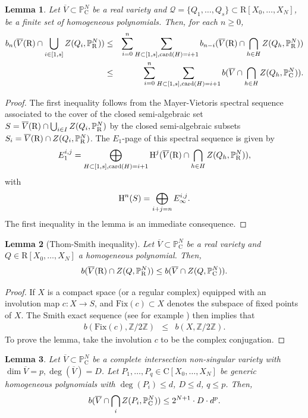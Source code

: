 \documentclass[10pt]{amsart}
\newtheorem{lemma}{Lemma}[section]
\theoremstyle{definition}
\theoremstyle{remark}
\numberwithin{equation}{section}
\newcommand {\R} {\mathrm{R}}
\newcommand {\C}     {\mathrm{C}}
\newcommand {\Z}  {\mathbb{Z}}
\newcommand {\ZZ} {{\rm Z}}
\newcommand {\PP}     {\mathbb{P}} %
\newcommand{\card}{\mathrm{card}}
\newcommand{\HH}  {\mbox{\rm H}}
\begin{document}
\begin{lemma}
    \label{lem:main:ordered:c:4}
    Let $\overline{V} \subset \PP^N_\C$ be a real variety and 
    $\mathcal{Q} = \{Q_1,\ldots,Q_s\} \subset \R[X_0,\ldots,X_N]$, be a finite set of  homogeneous polynomials. Then, for each $n \geq 0$,
    \begin{eqnarray*}
    b_n(\overline{V}(\R) \cap \bigcup_{i \in [1,s]} \ZZ(Q_i,\PP^N_\R)) &\leq& 
    \sum_{i=0}^{n} \sum_{H \subset [1,s], \card(H) = i+1} b_{n-i}(\overline{V}(\R) \cap \bigcap_{h \in H} \ZZ(Q_{h},\PP^N_\R)) \\
    &\leq&
    \sum_{i=0}^{n} \sum_{H \subset [1,s], \card(H) = i+1} b(\overline{V} \cap \bigcap_{h \in H} \ZZ(Q_{h},\PP^N_\C)).
    \end{eqnarray*}
\end{lemma}
\begin{proof}
    The first inequality follows from the Mayer-Vietoris spectral sequence associated to the cover of the closed semi-algebraic set 
    $S = \overline{V}(\R) \cap \bigcup_{i \in I} \ZZ(Q_i,\PP^N_\R)$ by the closed semi-algebraic  subsets $S_i = \overline{V}(\R) \cap \ZZ(Q_i,\PP^N_\R)$. The $E_1$-page of this spectral sequence is given by
    \[
    E_1^{i,j} = \bigoplus_{H \subset [1,s], \card(H) = i+1} \HH^{j}(\overline{V}(\R) \cap \bigcap_{h \in H} \ZZ(Q_{h},\PP^N_\R)),
    \]
    with
    \[
    \HH^n(S) = \bigoplus_{i+j=n} E_\infty^{i,j}.
    \]
    The first inequality in the lemma is an immediate consequence.
\end{proof}


\begin{lemma}[Thom-Smith inequality]
\label{lem:main:ordered:c:5}
    Let $\overline{V} \subset \PP^N_\C$ be a real variety and $Q \in \R[X_0,\ldots,X_N]$ a homogeneous polynomial. Then,
    \[
    b(\overline{V}(\R) \cap \ZZ(Q,\PP^N_\R)) \leq b(\overline{V} \cap \ZZ(Q,\PP^N_\C)).
    \]
\end{lemma}

\begin{proof}
    If $X$ is a compact space  (or a regular complex)  equipped with an involution map $c:X \rightarrow S$, and 
$\mathrm{Fix}(c) \subset X$ denotes the subspace of fixed points of $X$. The Smith exact sequence
(see for example 
\cite[page 126]{Bredon-book})
then implies that
\begin{eqnarray}
\label{eqn:Smith}
b(\mathrm{Fix}(c),\Z/2\Z) &\leq& b(X,\Z/2\Z).
\end{eqnarray}
To prove the lemma, take the involution $c$ to be the complex conjugation. 
\end{proof}
\begin{lemma}
\label{lem:main:ordered:c:6}
    Let $\overline{V} \subset \PP^N_\C$ be a complete intersection
    non-singular variety with $\dim \overline{V} = p, \deg(\overline{V}) = D$.
    Let $P_1,\ldots,P_q \in \C[X_0,\ldots,X_N]$ be generic homogeneous polynomials with $\deg(P_i) \leq d$, $D \leq d$, $q \leq p$.
    Then,
    \[
        b(\overline{V} \cap \bigcap_{i}\ZZ(P_i,\PP^N_\C)) \leq 2^{N+1} \cdot D \cdot  d^p.
    \]
\end{lemma}
\end{document}

